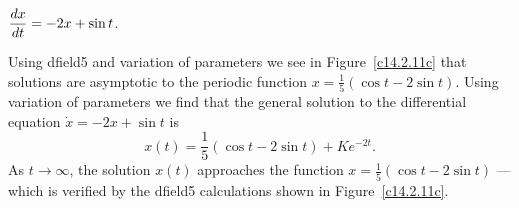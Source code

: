 \documentclass{ximera}
\begin{document}
\begin{exercise}   \label{c14.2.11c}
$\displaystyle\frac{dx}{dt} = -2 x + \sin t$.

\begin{solution}

Using {\sf dfield5} and variation of parameters we see in 
Figure~\ref{c14.2.11c} that solutions are asymptotic to the
periodic function $x=\frac{1}{5}(\cos t-2\sin t)$.
Using variation of parameters we find that the general solution to the
differential equation $\dot{x}=-2x+\sin t$ is 
\[
x(t) = \frac{1}{5}(\cos t-2\sin t) + Ke^{-2t}.
\]
As $t\to\infty$, the solution $x(t)$ approaches the function  
$x= \frac{1}{5}(\cos t-2\sin t)$ --- which is verified by the 
{\sf dfield5} calculations shown in Figure~\ref{c14.2.11c}.

\begin{figure}[htb]
     \centerline{%
     }
\end{figure} 



\end{solution}
\end{exercise}
\end{document}
